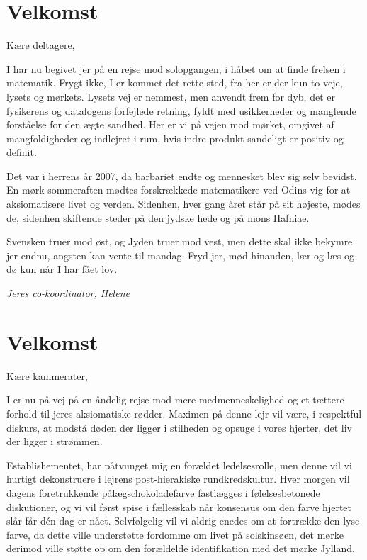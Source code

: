 

\begin{minipage}[b]{0.95\linewidth}
\begin{minipage}[t]{0.47\textwidth}
\vspace{3mm}

\section*{Velkomst}
Kære deltagere,

I har nu begivet jer på en rejse mod solopgangen, i håbet om at finde frelsen i matematik. Frygt ikke, I er kommet det rette sted, fra her er der kun to veje, lysets og mørkets. Lysets vej er nemmest, men anvendt frem for dyb, det er fysikerens og datalogens forfejlede retning, fyldt med usikkerheder og manglende forståelse for den ægte sandhed. Her er vi på vejen mod mørket, omgivet af mangfoldigheder og indlejret i rum, hvis indre produkt sandeligt er positiv og definit.

Det var i herrens år 2007, da barbariet endte og mennesket blev sig selv bevidst. En mørk sommeraften mødtes forskrækkede matematikere ved Odins vig for at aksiomatisere livet og verden. Sidenhen, hver gang året står på sit højeste, mødes de, sidenhen skiftende steder på den jydske hede og på mons Hafniae.

Svensken truer mod øst, og Jyden truer mod vest, men dette skal ikke bekymre jer endnu, angsten kan vente til mandag. Fryd jer, mød hinanden, lær og læs og dø kun når I har fået lov. 

{\flushright\emph{Jeres co-koordinator, Helene}}

\section*{Velkomst}
Kære kammerater,

I er nu på vej på en åndelig rejse mod mere medmenneskelighed og et tættere forhold til jeres aksiomatiske rødder. Maximen på denne lejr vil være, i respektful diskurs, at modstå døden der ligger i stilheden og opsuge i vores hjerter, det liv der ligger i strømmen. 

Establishementet, har påtvunget mig en forældet ledelsesrolle, men denne vil vi hurtigt dekonstruere i lejrens post-hierakiske rundkredskultur. Hver morgen vil dagens foretrukkende pålægschokoladefarve fastlægges i følelsesbetonede diskutioner, og vi vil først spise i fællesskab når konsensus om den farve hjertet slår får dén dag er nået. Selvfølgelig vil vi aldrig enedes om at fortrække den lyse farve, da dette ville understøtte fordomme om livet på solskinsøen, det mørke derimod ville støtte op om den forældelde identifikation med det mørke Jylland. 


\end{minipage}
\end{minipage}
